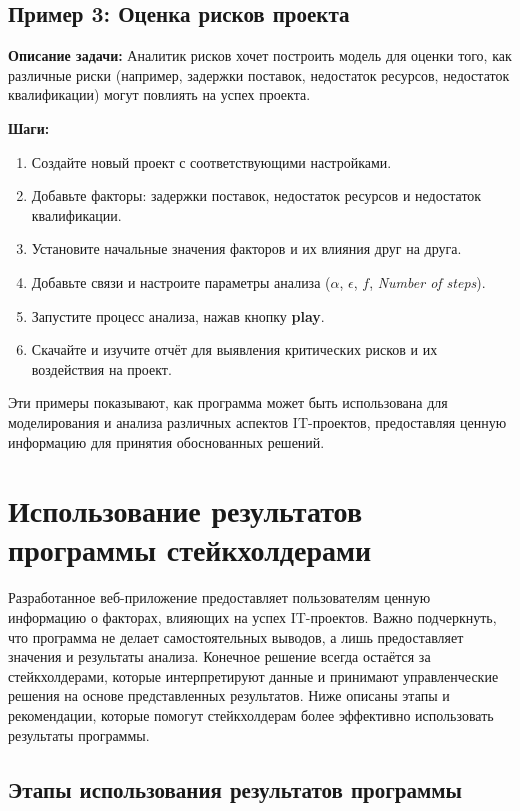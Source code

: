 \documentclass{article}
\begin{document}
    \subsection{Пример 3: Оценка рисков проекта}

    \textbf{Описание задачи:} Аналитик рисков хочет построить модель для оценки того, как различные риски (например, задержки поставок, недостаток ресурсов, недостаток квалификации) могут повлиять на успех проекта.

    \textbf{Шаги:}
    \begin{enumerate}
        \item Создайте новый проект с соответствующими настройками.
        \item Добавьте факторы: задержки поставок, недостаток ресурсов и недостаток квалификации.
        \item Установите начальные значения факторов и их влияния друг на друга.
        \item Добавьте связи и настроите параметры анализа ($\alpha$, $\epsilon$, $f$, \textit{Number of steps}).
        \item Запустите процесс анализа, нажав кнопку \textbf{play}.
        \item Скачайте и изучите отчёт для выявления критических рисков и их воздействия на проект.
    \end{enumerate}

    Эти примеры показывают, как программа может быть использована для моделирования и анализа различных аспектов IT-проектов, предоставляя ценную информацию для принятия обоснованных решений.
    \newpage
    \section{Использование результатов программы стейкхолдерами}

    Разработанное веб-приложение предоставляет пользователям ценную информацию о факторах, влияющих на успех IT-проектов. Важно подчеркнуть, что программа не делает самостоятельных выводов, а лишь предоставляет значения и результаты анализа. Конечное решение всегда остаётся за стейкхолдерами, которые интерпретируют данные и принимают управленческие решения на основе представленных результатов. Ниже описаны этапы и рекомендации, которые помогут стейкхолдерам более эффективно использовать результаты программы.

    \subsection{Этапы использования результатов программы}
\end{document}
